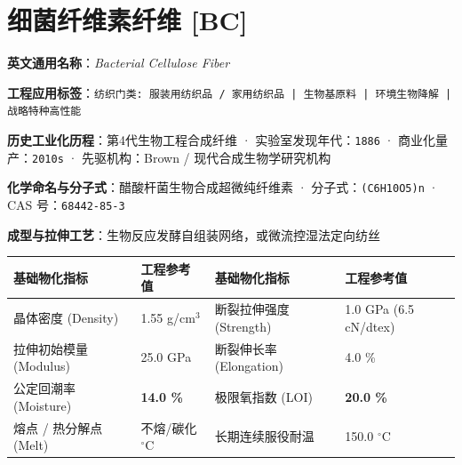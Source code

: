 \documentclass[11pt,openright,twoside,UTF8]{ctexbook}
\begin{document}
\section{细菌纤维素纤维 [BC]}
\label{sec:bc}

\noindent\textbf{英文通用名称}：\textit{Bacterial Cellulose Fiber}\par
\noindent\textbf{工程应用标签}：\texttt{纺织门类: 服装用纺织品 / 家用纺织品 | 生物基原料 | 环境生物降解 | 战略特种高性能}\par
\noindent\textbf{历史工业化历程}：第4代生物工程合成纤维 · 实验室发现年代：\texttt{1886} · 商业化量产：\texttt{2010s} · 先驱机构：Brown / 现代合成生物学研究机构\par
\noindent\textbf{化学命名与分子式}：醋酸杆菌生物合成超微纯纤维素 · 分子式：\texttt{(C6H10O5)n} · CAS 号：\texttt{68442-85-3}\par
\noindent\textbf{成型与拉伸工艺}：生物反应发酵自组装网络，或微流控湿法定向纺丝\par

\vspace{0.15cm}
\begin{center}
\small
\begin{tabularx}{\textwidth}{p{3.8cm}Xp{3.8cm}X}
\toprule
\textbf{基础物化指标} & \textbf{工程参考值} & \textbf{基础物化指标} & \textbf{工程参考值} \\
\midrule
晶体密度 (Density) & 1.55 g/cm$^3$ & 断裂拉伸强度 (Strength) & 1.0 GPa (6.5 cN/dtex) \\
拉伸初始模量 (Modulus) & 25.0 GPa & 断裂伸长率 (Elongation) & 4.0 \% \\
公定回潮率 (Moisture) & \textbf{14.0 \%} & 极限氧指数 (LOI) & \textbf{20.0 \%} \\
熔点 / 热分解点 (Melt) & 不熔/碳化 $^\circ\mathrm{C}$ & 长期连续服役耐温 & 150.0 $^\circ\mathrm{C}$ \\
\bottomrule
\end{tabularx}
\end{center}
\vspace{0.15cm}
\end{document}
